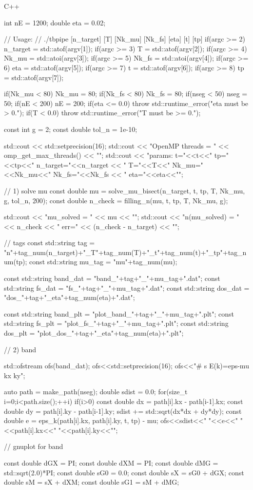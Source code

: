 \documentclass[12pt]{jreport}
\begin{document}
\begin{codebox}{C++}
{    int nE = 1200;
    double eta = 0.02;

    // Usage:
    // ./tbpipe [n_target] [T] [Nk_mu] [Nk_fs] [eta] [t] [tp]
    if(argc >= 2) n_target = std::atof(argv[1]);
    if(argc >= 3) T        = std::atof(argv[2]);
    if(argc >= 4) Nk_mu    = std::atoi(argv[3]);
    if(argc >= 5) Nk_fs    = std::atoi(argv[4]);
    if(argc >= 6) eta      = std::atof(argv[5]);
    if(argc >= 7) t        = std::atof(argv[6]);
    if(argc >= 8) tp       = std::atof(argv[7]);

    if(Nk_mu < 80) Nk_mu = 80;
    if(Nk_fs < 80) Nk_fs = 80;
    if(nseg  < 50) nseg  = 50;
    if(nE    < 200) nE   = 200;
    if(eta <= 0.0) throw std::runtime_error("eta must be > 0.");
    if(T < 0.0)    throw std::runtime_error("T must be >= 0.");

    const int g = 2;
    const double tol_n = 1e-10;

    std::cout << std::setprecision(16);
    std::cout << "OpenMP threads = " << omp_get_max_threads() << "\n";
    std::cout << "params: t="<<t<<" tp="<<tp<<"  n_target="<<n_target
              << "  T="<<T<<"  Nk_mu="<<Nk_mu<<" Nk_fs="<<Nk_fs
              << "  eta="<<eta<<"\n";

    // 1) solve mu
    const double mu = solve_mu_bisect(n_target, t, tp, T, Nk_mu, g, tol_n, 200);
    const double n_check = filling_n(mu, t, tp, T, Nk_mu, g);

    std::cout << "mu_solved = " << mu << "\n";
    std::cout << "n(mu_solved) = " << n_check << "  err=" << (n_check - n_target) << "\n";

    // tags
    const std::string tag = "n"+tag_num(n_target)+"_T"+tag_num(T)+"_t"+tag_num(t)+"_tp"+tag_num(tp);
    const std::string mu_tag = "mu"+tag_num(mu);

    const std::string band_dat = "band_"+tag+"_"+mu_tag+".dat";
    const std::string fs_dat   = "fs_"+tag+"_"+mu_tag+".dat";
    const std::string dos_dat  = "dos_"+tag+"_eta"+tag_num(eta)+".dat";

    const std::string band_plt = "plot_band_"+tag+"_"+mu_tag+".plt";
    const std::string fs_plt   = "plot_fs_"+tag+"_"+mu_tag+".plt";
    const std::string dos_plt  = "plot_dos_"+tag+"_eta"+tag_num(eta)+".plt";

    // 2) band
    {
        std::ofstream ofs(band_dat);
        ofs<<std::setprecision(16);
        ofs<<"# s  E(k)=eps-mu  kx  ky\n";

        auto path = make_path(nseg);
        double sdist = 0.0;
        for(size_t i=0;i<path.size();++i){
            if(i>0){
                const double dx = path[i].kx - path[i-1].kx;
                const double dy = path[i].ky - path[i-1].ky;
                sdist += std::sqrt(dx*dx + dy*dy);
            }
            const double e = eps_k(path[i].kx, path[i].ky, t, tp) - mu;
            ofs<<sdist<<" "<<e<<" "<<path[i].kx<<" "<<path[i].ky<<"\n";
        }
    }
    // gnuplot for band
    {
        const double dGX = PI;
        const double dXM = PI;
        const double dMG = std::sqrt(2.0)*PI;
        const double sG0 = 0.0;
        const double sX  = sG0 + dGX;
        const double sM  = sX + dXM;
        const double sG1 = sM + dMG;

}}
\end{codebox}
\end{document}

